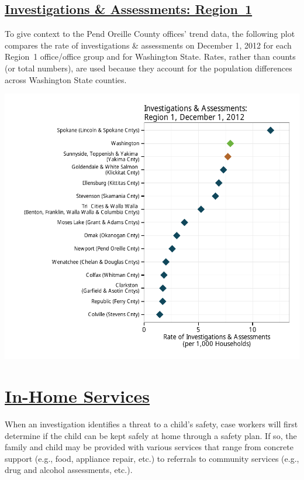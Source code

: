 \documentclass{article}\usepackage[]{graphicx}\usepackage[]{color}
\makeatletter
\def\maxwidth{ %
  \ifdim\Gin@nat@width>\linewidth
    \linewidth
  \else
    \Gin@nat@width
  \fi
}
\newenvironment{knitrout}{}{} %
\makeatother
\begin{document}
\subsection{
    \href{http://www.partnersforourchildren.org//child-well-being/visualizations/investigations-assessments/trends}
    {Investigations \& Assessments: Region~1}}
To give context to the Pend Oreille County offices' trend data, the following plot compares the rate of investigations \& assessments on December 1, 2012 for each Region~1 office/office group and for Washington State.  Rates, rather than counts (or total numbers), are used because they account for the population differences across Washington State counties.
\nopagebreak[3]
\begin{knitrout}
\color{fgcolor}

{\centering \includegraphics[width=\maxwidth]{figure/ia_context} 

}



\end{knitrout}



\newpage
\section{\href{http://www.partnersforourchildren.org/child-well-being/visualizations/home-services/trends}
    {In-Home Services}
}
When an investigation identifies a threat to a child's safety, case workers will first determine if the child can be kept safely at home through a safety plan. If so, the family and child may be provided with various services that range from concrete support (e.g., food, appliance repair, etc.) to referrals to community services (e.g., drug and alcohol assessments, etc.).\\[6pt]
\label{p:ihs}
\end{document}
